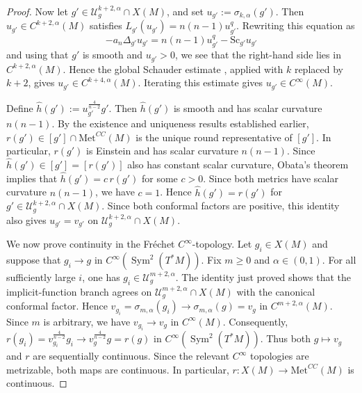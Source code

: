 \documentclass[12pt,oneside,a4paper]{article}
\theoremstyle{mytheorem}
\theoremstyle{remark}
\theoremstyle{definition}
\begin{document}
\begin{proof}
Now let \(g'\in \mathcal{U}_g^{k+2,\alpha}\cap X(M)\), and set
$u_{g'}:=\sigma_{k,\alpha}(g')$. Then
\(u_{g'}\in C^{k+2,\alpha}(M)\) satisfies
\(
L_{g'}(u_{g'})=n(n-1)u_{g'}^q.
\)
Rewriting this equation as
\[
-a_n\Delta_{g'}u_{g'}
=n(n-1)u_{g'}^q-\mathrm{Sc}_{g'}u_{g'}
\]
and using that $g'$ is smooth and $u_{g'}>0$, we see that the
right-hand side lies in $C^{k+2,\alpha}(M)$. Hence the global Schauder
estimate \cite[Theorem~2.5(b)]{zbMATH04030435}, applied with $k$ replaced by
$k+2$, gives
$u_{g'}\in C^{k+4,\alpha}(M)$. Iterating this estimate gives
$u_{g'}\in C^\infty(M)$.

Define
\(\widehat h(g'):=u_{g'}^{\frac{4}{n-2}}g'\).
Then \(\widehat h(g')\) is smooth and has scalar curvature \(n(n-1)\). By the
existence and uniqueness results established earlier, \(r(g')\in[g']\cap
\mathrm{Met}^{CC}(M)\) is the unique round representative of \([g']\). In particular,
\(r(g')\) is Einstein and has scalar curvature \(n(n-1)\). Since
\(\widehat h(g')\in[g']=[r(g')]\) also has constant scalar curvature,
Obata's theorem implies that $\widehat h(g')=c\,r(g')$
for some \(c>0\). Since both metrics have scalar curvature \(n(n-1)\), we have \(c=1\). Hence
\(\widehat h(g')=r(g')\)
for \(g'\in \mathcal{U}_g^{k+2,\alpha}\cap X(M)\).
Since both conformal factors are positive, this identity also gives
$u_{g'}=v_{g'}$ on $\mathcal{U}_g^{k+2,\alpha}\cap X(M)$.


We now prove continuity in the Fr\'echet $C^\infty$-topology. Let
$g_i\in X(M)$ and suppose that $g_i\to g$ in
$C^\infty(\operatorname{Sym}^2(T^*M))$. Fix $m\geq0$ and
$\alpha\in(0,1)$. For all sufficiently large $i$, one has
$g_i\in\mathcal{U}_g^{m+2,\alpha}$. The identity just proved shows that the
implicit-function branch agrees on
$\mathcal{U}_g^{m+2,\alpha}\cap X(M)$ with the canonical conformal factor.
Hence
\(v_{g_i}=\sigma_{m,\alpha}(g_i)
\to \sigma_{m,\alpha}(g)=v_g\)
in \(C^{m+2,\alpha}(M)\).
Since $m$ is arbitrary, we have
\(v_{g_i}\to v_g\)
in \(C^\infty(M)\).
Consequently,
\(r(g_i)=v_{g_i}^{\frac{4}{n-2}}g_i
\to
v_g^{\frac{4}{n-2}}g=r(g)\)
in \(C^\infty(\operatorname{Sym}^2(T^*M))\).
Thus both $g\mapsto v_g$ and $r$ are sequentially continuous. Since the
relevant $C^\infty$ topologies are metrizable, both maps are continuous. In
particular,
\(r\colon X(M)\to \mathrm{Met}^{CC}(M)\)
is continuous.


\end{proof}
\end{document}
